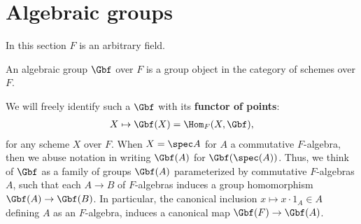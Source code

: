 


\section{Algebraic groups}
In this section $F$ is an arbitrary field.
\begin{defn}
    An algebraic group $\Gbf$ over $F$ is a group object in the category of schemes over $F$.
\end{defn}
We will freely identify such a $\Gbf$ with its \textbf{functor of points}:
\begin{align}
    X \mapsto \Gbf(X) = \Hom_F(X,\Gbf),
\end{align}
for any scheme $X$ over $F$. When $X=\spec A$ for $A$ a commutative $F$-algebra, then we abuse notation in writing $\Gbf(A)$ for $\Gbf(\spec(A))$.
Thus, we think of $\Gbf$ as a family of groups $\Gbf(A)$ parameterized by commutative $F$-algebras $A$, such that each $A \to B$ of $F$-algebras induces a group homomorphism $\Gbf(A)\to \Gbf(B)$.
In particular, the canonical inclusion $x\mapsto x \cdot 1_A \in A$ defining $A$ as an $F$-algebra, induces a canonical map $\Gbf(F) \to \Gbf(A)$.

